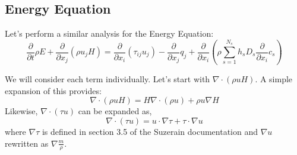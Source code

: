 \documentclass[10pt]{article}
\begin{document}
%
%
%

\subsection{Energy Equation}

Let's perform a similar analysis for the Energy Equation:
\begin{equation}
\frac{\partial}{\partial t} \rho E + \frac{\partial }{\partial x_j}\left(\rho
u_j H\right) = \frac{\partial }{\partial x_i}\left(\tau_{ij}u_j\right) -
\frac{\partial }{\partial x_j}q_j + \frac{\partial }{\partial x_i}\left(\rho
\sum^{N_s}_{s=1} h_s D_s \frac{\partial}{\partial x_i} c_s\right)
\end{equation}

We will consider each term individually. Let's start with $\nabla \cdot (\rho u H)$. A simple expansion of this provides:
\begin{equation}
  \nabla \cdot (\rho u H) = H \nabla \cdot (\rho u) + \rho u \nabla H
\end{equation}
Likewise, $\nabla \cdot (\tau u)$ can be expanded as,
\begin{equation}
 \nabla \cdot (\tau u) = u \cdot \nabla \tau + \tau \cdot \nabla u
\end{equation}
where $\nabla \tau$ is defined in section 3.5 of the Suzerain documentation and
$\nabla u$ rewritten as $\nabla \frac{m}{\rho}$.
\end{document}
